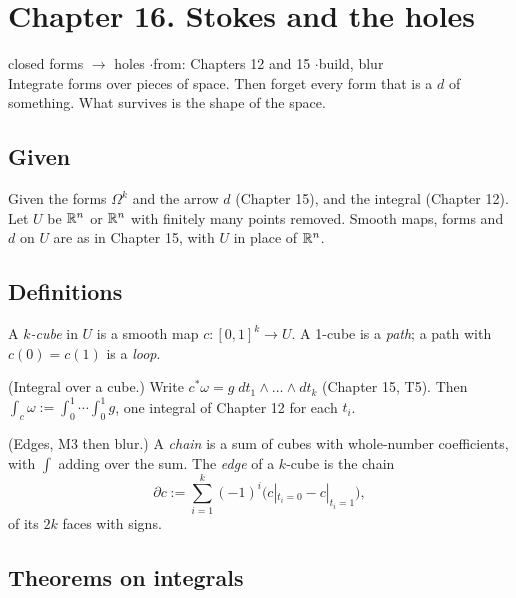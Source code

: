 \section*{Chapter 16. Stokes and the holes}
\begin{center}
{\normalsize closed forms $\to$ holes \quad$\cdot$\quad from: Chapters 12 and 15 \quad$\cdot$\quad build, blur}\\[4pt]
{\small Integrate forms over pieces of space. Then forget every form that is a $d$ of something. What survives is the shape of the space.}
\end{center}

\subsection*{Given}

Given the forms $\Omega^k$ and the arrow $d$ (Chapter 15), and the integral (Chapter 12). Let $U$ be $\mathbb{R}^n$ or $\mathbb{R}^n$ with finitely many points removed. Smooth maps, forms and $d$ on $U$ are as in Chapter 15, with $U$ in place of $\mathbb{R}^n$.

\subsection*{Definitions}

\begin{lines}
\item[\lab{D1}] A \emph{$k$-cube} in $U$ is a smooth map $c : [0,1]^k \to U$. A 1-cube is a \emph{path}; a path with $c(0) = c(1)$ is a \emph{loop}.
\item[\lab{D2}] (Integral over a cube.) Write $c^*\omega = g\; dt_1 \wedge \dots \wedge dt_k$ (Chapter 15, T5). Then $\int_c \omega := \int_0^1 \cdots \int_0^1 g$, one integral of Chapter 12 for each $t_i$.
\item[\lab{D3}] (Edges, M3 then blur.) A \emph{chain} is a sum of cubes with whole-number coefficients, with $\int$ adding over the sum. The \emph{edge} of a $k$-cube is the chain
\[
\partial c := \sum_{i=1}^{k} (-1)^i \bigl( c|_{t_i = 0} - c|_{t_i = 1} \bigr),
\]
of its $2k$ faces with signs.
\end{lines}

\subsection*{Theorems on integrals}

